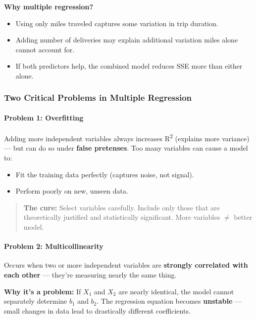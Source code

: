 \documentclass[12pt,openany]{book}
\begin{document}
\textbf{Why multiple regression?}
\begin{itemize}[leftmargin=*]
    \item Using only miles traveled captures some variation in trip duration.
    \item Adding number of deliveries may explain additional variation miles alone cannot account for.
    \item If both predictors help, the combined model reduces SSE more than either alone.

\end{itemize}

\medskip


\subsubsection{Two Critical Problems in Multiple Regression}


\paragraph{Problem 1: Overfitting}


Adding more independent variables always increases R\textsuperscript{2} (explains more variance) --- but can do so under \textbf{false pretenses}. Too many variables can cause a model to:
\begin{itemize}[leftmargin=*]
    \item Fit the training data perfectly (captures noise, not signal).
    \item Perform poorly on new, unseen data.

\end{itemize}

\begin{quote}
\textbf{The cure:} Select variables carefully. Include only those that are theoretically justified and statistically significant. More variables \(\neq\) better model.
\end{quote}


\paragraph{Problem 2: Multicollinearity}


Occurs when two or more independent variables are \textbf{strongly correlated with each other} --- they're measuring nearly the same thing.

\textbf{Why it's a problem:} If \(X_1\) and \(X_2\) are nearly identical, the model cannot separately determine \(b_1\) and \(b_2\). The regression equation becomes \textbf{unstable} --- small changes in data lead to drastically different coefficients.
\end{document}
